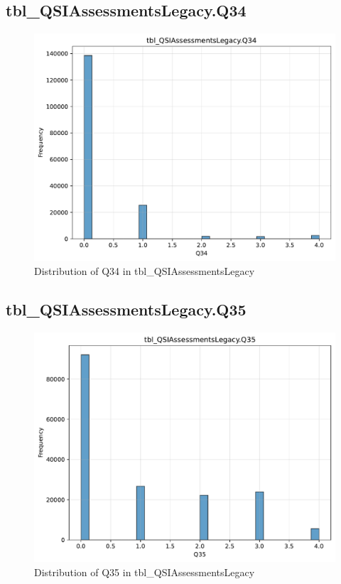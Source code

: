 \subsection{tbl\_QSIAssessmentsLegacy.Q34}

\begin{figure}[htbp]
\centering
\includegraphics[width=\textwidth]{figures/dbo_tbl_QSIAssessmentsLegacy_Q34.pdf}
\caption{Distribution of Q34 in tbl\_QSIAssessmentsLegacy}
\end{figure}\newpage

\subsection{tbl\_QSIAssessmentsLegacy.Q35}

\begin{figure}[htbp]
\centering
\includegraphics[width=\textwidth]{figures/dbo_tbl_QSIAssessmentsLegacy_Q35.pdf}
\caption{Distribution of Q35 in tbl\_QSIAssessmentsLegacy}
\end{figure}\newpage

